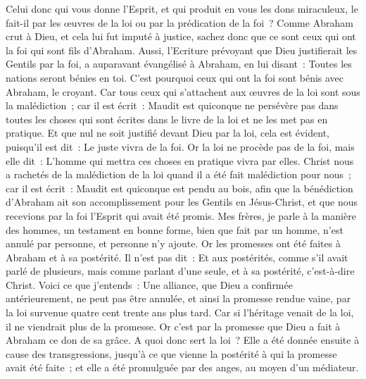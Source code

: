 \begin{multicols}{2}
Celui donc qui vous donne l'Esprit, et qui produit en vous les dons miraculeux, le fait-il par les œuvres de la loi ou par la prédication de la foi~?
Comme Abraham crut à Dieu, et cela lui fut imputé à justice,
sachez donc que ce sont ceux qui ont la foi qui sont fils d'Abraham.
Aussi, l'Ecriture prévoyant que Dieu justifierait les Gentils par la foi, a auparavant évangélisé à Abraham, en lui disant~: Toutes les nations seront bénies en toi.
C'est pourquoi ceux qui ont la foi sont bénis avec Abraham, le croyant.
Car tous ceux qui s'attachent aux œuvres de la loi sont sous la malédiction~; car il est écrit~: Maudit est quiconque ne persévère pas dans toutes les choses qui sont écrites dans le livre de la loi et ne les met pas en pratique.
Et que nul ne soit justifié devant Dieu par la loi, cela est évident, puisqu'il est dit~: Le juste vivra de la foi.
Or la loi ne procède pas de la foi, mais elle dit~: L'homme qui mettra ces choses en pratique vivra par elles.
Christ nous a rachetés de la malédiction de la loi quand il a été fait malédiction pour nous~; car il est écrit~: Maudit est quiconque est pendu au bois,
afin que la bénédiction d'Abraham ait son accomplissement pour les Gentils en Jésus-Christ, et que nous recevions par la foi l'Esprit qui avait été promis.
Mes frères, je parle à la manière des hommes, un testament en bonne forme, bien que fait par un homme, n'est annulé par personne, et personne n'y ajoute.
Or les promesses ont été faites à Abraham et à sa postérité. Il n'est pas dit~: Et aux postérités, comme s'il avait parlé de plusieurs, mais comme parlant d'une seule, et à sa postérité, c'est-à-dire Christ.
Voici ce que j'entends~: Une alliance, que Dieu a confirmée antérieurement, ne peut pas être annulée, et ainsi la promesse rendue vaine, par la loi survenue quatre cent trente ans plus tard.
Car si l'héritage venait de la loi, il ne viendrait plus de la promesse. Or c'est par la promesse que Dieu a fait à Abraham ce don de sa grâce.
A quoi donc sert la loi~? Elle a été donnée ensuite à cause des transgressions, jusqu'à ce que vienne la postérité à qui la promesse avait été faite~; et elle a été promulguée par des anges, au moyen d'un médiateur.

\end{multicols}
